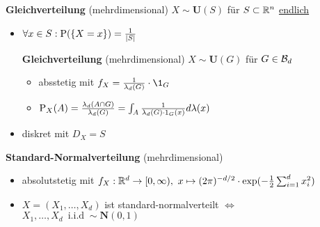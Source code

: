 \textbf{Gleichverteilung} (mehrdimensional) $X\sim\mathbf{U}(S)$ für $S\subset\R^n$
\underline{endlich}
\begin{itemize}
\item $\forall x\in S: \P(\{X=x\})=\frac{1}{|S|}$

\textbf{Gleichverteilung} (mehrdimensional) $X\sim\mathbf{U}(G)$ für $G\in\B{d}$
\begin{itemize}
\item absstetig mit $f_X=\frac{1}{\lambda_d(G)}\cdot \1_G$

\item $\P_X(A)=\frac{\lambda_d(A\cap G)}{\lambda_d(G)}=
\int_A \frac{1}{\lambda_d(G)\cdot 1_G(x)}d\lambda(x)$
\end{itemize}

\item diskret mit $D_X=S$
\end{itemize}

\textbf{Standard-Normalverteilung} (mehrdimensional)
\begin{itemize}
\item absolutstetig mit 
$f_X:\R^d\to [0,\infty),\ 
x\mapsto(2\pi)^{-d/2}\cdot\exp(-\frac{1}{2}\sum_{i=1}^{d}x_i^2)$

\item $X=(X_1,\ldots,X_d)$ ist standard-normalverteilt 
$\Leftrightarrow$ $X_1,\ldots,X_d\ \operatorname{i.i.d}\sim\mathbf{N}(0,1)$
\end{itemize}

